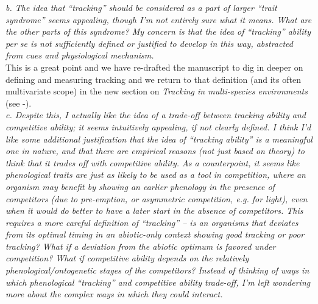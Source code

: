 \documentclass[11pt]{article}
\begin{document}
\emph{b.      The idea that ``tracking'' should be considered as a part of larger ``trait syndrome''
seems appealing, though I'm not entirely sure what it means. What are the other parts of this
syndrome? My concern is that the idea of ``tracking'' ability per se is not sufficiently
defined or justified to develop in this way, abstracted from cues and physiological
mechanism.}\\

This is a great point and we have re-drafted the manuscript to dig in deeper on defining and measuring tracking and we return to that definition (and its often multivariate scope) in the new section on \emph{Tracking in multi-species environments} (see -).\\

\emph{c.      Despite this, I actually like the idea of a trade-off between tracking ability and
competitive ability; it seems intuitively appealing, if not clearly defined. I think I'd like
some additional justification that the idea of ``tracking ability'' is a meaningful one in
nature, and that there are empirical reasons (not just based on theory) to think that it
trades off with competitive ability. As a counterpoint, it seems like phenological traits are
just as likely to be used as a tool in competition, where an organism may benefit by showing
an earlier phenology in the presence of competitors (due to pre-emption, or asymmetric
competition, e.g. for light), even when it would do better to have a later start in the
absence of competitors. This requires a more careful definition of ``tracking'' – is an
organisms that deviates from its optimal timing in an abiotic-only context showing good
tracking or poor tracking?  What if a deviation from the abiotic optimum is favored under
competition? What if competitive ability depends on the relatively phenological/ontogenetic
stages of the competitors? Instead of thinking of ways in which phenological “tracking” and
competitive ability trade-off, I'm left wondering more about the complex ways in which they
could interact.}\\
\end{document}

